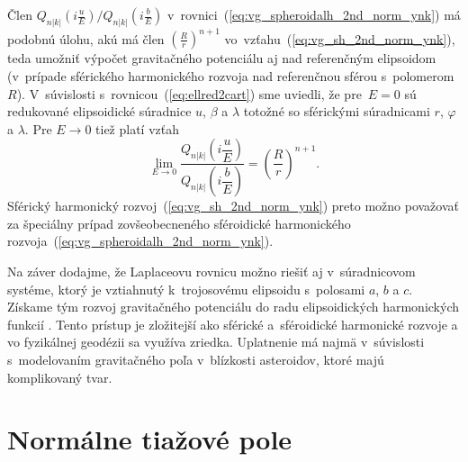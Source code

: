 \documentclass[a4paper,12pt]{book}
\begin{document}
Člen $Q_{n|k|}\left( i \frac{u}{E} \right) \slash Q_{n|k|}\left( i \frac{b}{E} 
\right)$ v~rovnici~(\ref{eq:vg_spheroidalh_2nd_norm_ynk}) má podobnú úlohu, akú 
má člen $\left( \frac{R}{r} \right)^{n + 1}$ 
vo~vzťahu~(\ref{eq:vg_sh_2nd_norm_ynk}), teda umožniť výpočet gravitačného 
potenciálu aj nad referenčným elipsoidom (v~prípade sférického harmonického 
rozvoja nad referenčnou sférou s~polomerom~$R$).  V~súvislosti 
s~rovnicou~(\ref{eq:ellred2cart}) sme uviedli, že pre~$E = 0$ sú redukované 
elipsoidické súradnice $u$, $\beta$ a $\lambda$ totožné so sférickými 
súradnicami $r$, $\varphi$ a $\lambda$.  Pre $E \rightarrow 0$ tiež platí vzťah 
\parencite{MoritzPhysicalGeodesy}
%
\begin{equation}
\lim_{E \rightarrow 0} \frac{Q_{n|k|}\left( i \dfrac{u}{E} 
\right)}{Q_{n|k|}\left( i \dfrac{b}{E} \right)} = \left( \frac{R}{r} \right)^{n 
+ 1}{.}
\end{equation}
%
Sférický harmonický rozvoj~(\ref{eq:vg_sh_2nd_norm_ynk}) preto možno považovať 
za špeciálny prípad zovšeobecneného sféroidické harmonického 
rozvoja~(\ref{eq:vg_spheroidalh_2nd_norm_ynk}).

Na záver dodajme, že Laplaceovu rovnicu možno riešiť aj v~súradnicovom systéme, 
ktorý je vztiahnutý k~trojosovému elipsoidu s~polosami $a$, $b$ a $c$.  Získame 
tým rozvoj gravitačného potenciálu do radu elipsoidických harmonických funkcií 
\parencite[napríklad][]{Garmier2001,Hu2015,Reimond2016}.  Tento prístup je 
zložitejší ako sférické a~sféroidické harmonické rozvoje a vo fyzikálnej 
geodézii sa využíva zriedka.  Uplatnenie má najmä v~súvislosti s~modelovaním 
gravitačného poľa v~blízkosti asteroidov, ktoré majú komplikovaný tvar.










\chapter{Normálne tiažové pole}
\label{sec:normal_gravity_field}
\end{document}
